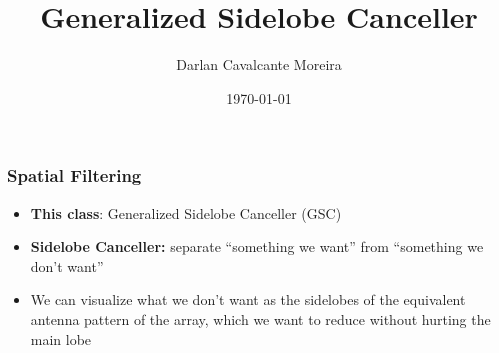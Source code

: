 \documentclass{beamer}
\title%
{Generalized Sidelobe Canceller}
\author%
{Darlan Cavalcante Moreira}
\institute%
{Universidade Federal do Ceará}
\date{\today}
\begin{document}




\begin{frame}
  \titlepage
\end{frame}





\begin{frame}
  \frametitle{Spatial Filtering}

  \begin{itemize}
    
    \item \textbf{This class}: Generalized Sidelobe Canceller (GSC)
    
    
    \item \textbf{Sidelobe Canceller:} separate ``something we want'' from ``something
    we don't want''
    
    \item We can visualize what we don't want as the sidelobes of the
    equivalent antenna pattern of the array, which we want to reduce without
    hurting the main lobe
    
    
  \end{itemize}
\end{frame}
\end{document}
